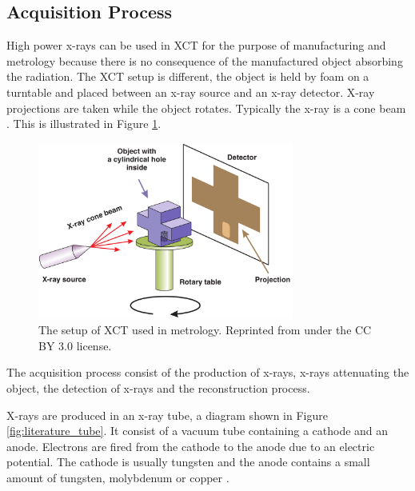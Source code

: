 \subsection{Acquisition Process}

High power x-rays can be used in XCT for the purpose of manufacturing and metrology because there is no consequence of the manufactured object absorbing the radiation. The XCT setup is different, the object is held by foam on a turntable and placed between an x-ray source and an x-ray detector. X-ray projections are taken while the object rotates. Typically the x-ray is a cone beam \citep{kruth2011computed}. This is illustrated in Figure \ref{fig:literature_xct}.

\begin{figure}
  \centering
  \includegraphics[width=0.75\textwidth]{../figures/literatureReview/literature_xct.png}
  \caption{The setup of XCT used in metrology. Reprinted from \cite{warnett2016towards} under the CC BY 3.0 license.}
  \label{fig:literature_xct}
\end{figure}

The acquisition process consist of the production of x-rays, x-rays attenuating the object, the detection of x-rays and the reconstruction process.

X-rays \citep{rontgen1896on} are produced in an x-ray tube, a diagram shown in Figure \ref{fig:literature_tube}. It consist of a vacuum tube containing a cathode and an anode. Electrons are fired from the cathode to the anode due to an electric potential. The cathode is usually tungsten and the anode contains a small amount of tungsten, molybdenum or copper \citep{sun2012overview}.

